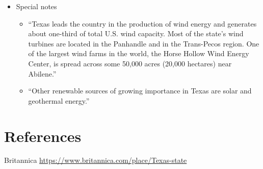 \documentclass[9pt,twocolumn,twoside]{pnas-new}
\begin{document}
\begin{itemize}
\item Special notes
\begin{itemize}
\item “Texas leads the country in the production of wind energy and generates about one-third of total U.S. wind capacity. Most of the state’s wind turbines are located in the Panhandle and in the Trans-Pecos region. One of the largest wind farms in the world, the Horse Hollow Wind Energy Center, is spread across some 50,000 acres (20,000 hectares) near Abilene.”
\item “Other renewable sources of growing importance in Texas are solar and geothermal energy.”

\end{itemize}

\end{itemize}

\section*{References}

Britannica \url{ https://www.britannica.com/place/Texas-state}
\end{document}
